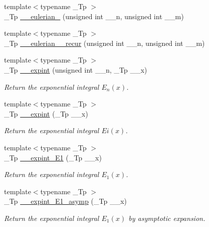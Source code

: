 \begin{DoxyCompactItemize}
\item 
{\footnotesize template$<$typename \+\_\+\+Tp $>$ }\\\+\_\+\+Tp \hyperlink{namespacestd_1_1____detail_aa93423478ed5fd1fc260cc30466bef73}{\+\_\+\+\_\+eulerian\+\_} (unsigned int \+\_\+\+\_\+n, unsigned int \+\_\+\+\_\+m)
\item 
{\footnotesize template$<$typename \+\_\+\+Tp $>$ }\\\+\_\+\+Tp \hyperlink{namespacestd_1_1____detail_a8a2a09c66c530759ae98ac1f3c1d93e5}{\+\_\+\+\_\+eulerian\+\_\+\_\+recur} (unsigned int \+\_\+\+\_\+n, unsigned int \+\_\+\+\_\+m)
\item 
{\footnotesize template$<$typename \+\_\+\+Tp $>$ }\\\+\_\+\+Tp \hyperlink{namespacestd_1_1____detail_a0282700710ec07b8ca095fe2ec140d6e}{\+\_\+\+\_\+expint} (unsigned int \+\_\+\+\_\+n, \+\_\+\+Tp \+\_\+\+\_\+x)
\begin{DoxyCompactList}\small\item\em Return the exponential integral $ E_n(x) $. \end{DoxyCompactList}\item 
{\footnotesize template$<$typename \+\_\+\+Tp $>$ }\\\+\_\+\+Tp \hyperlink{namespacestd_1_1____detail_abefd4102ce8a673604204e360074ceaa}{\+\_\+\+\_\+expint} (\+\_\+\+Tp \+\_\+\+\_\+x)
\begin{DoxyCompactList}\small\item\em Return the exponential integral $ Ei(x) $. \end{DoxyCompactList}\item 
{\footnotesize template$<$typename \+\_\+\+Tp $>$ }\\\+\_\+\+Tp \hyperlink{namespacestd_1_1____detail_a665eb0c524b929c035d88bbb17815917}{\+\_\+\+\_\+expint\+\_\+\+E1} (\+\_\+\+Tp \+\_\+\+\_\+x)
\begin{DoxyCompactList}\small\item\em Return the exponential integral $ E_1(x) $. \end{DoxyCompactList}\item 
{\footnotesize template$<$typename \+\_\+\+Tp $>$ }\\\+\_\+\+Tp \hyperlink{namespacestd_1_1____detail_abd02a300cd209be618a6e054a706c012}{\+\_\+\+\_\+expint\+\_\+\+E1\+\_\+asymp} (\+\_\+\+Tp \+\_\+\+\_\+x)
\begin{DoxyCompactList}\small\item\em Return the exponential integral $ E_1(x) $ by asymptotic expansion. \end{DoxyCompactList}\item 

\end{DoxyCompactItemize}
